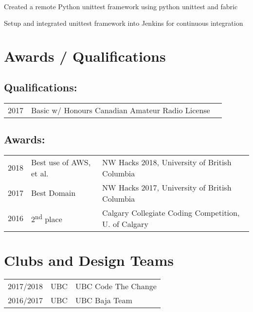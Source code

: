 \documentclass[]{deedy-resume-openfont}
\begin{document}
\begin{minipage}[t]{0.66\textwidth}
\begin{tightemize}
\item Created a remote Python unittest framework using python unittest and fabric
\item Setup and integrated unittest framework into Jenkins for continuous integration
\end{tightemize}
\sectionsep


\section{Awards / Qualifications} 
\subsection{Qualifications:}
\begin{tabular}{rll}
2017         & Basic w/ Honours \quad \qquad Canadian Amateur Radio License\\
\end{tabular}

\subsection{Awards:}
\begin{tabular}{rll}
2018         & Best use of AWS, et al.      & NW Hacks 2018, University of British Columbia\\
2017         & Best Domain                  & NW Hacks 2017, University of British Columbia\\
2016         & 2\textsuperscript{nd} place  & Calgary Collegiate Coding Competition, U. of Calgary\\
\end{tabular}
\sectionsep


\section{Clubs and Design Teams} 

\begin{tabular}{rll}
2017/2018   & UBC   & UBC Code The Change\\
2016/2017   & UBC   & UBC Baja Team\\
\end{tabular}
\sectionsep

\end{minipage} 
\end{document}
